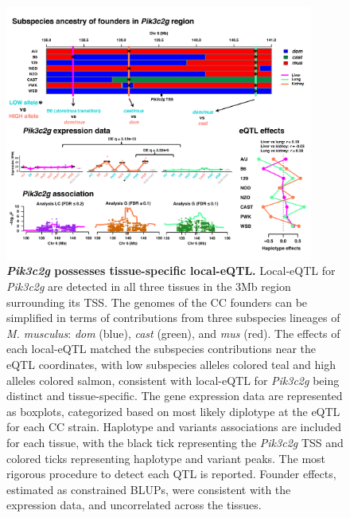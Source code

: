\documentclass[9pt,twocolumn,twoside]{gsajnl}
\begin{document}
\begin{figure}[h]
\renewcommand{\familydefault}{\sfdefault}\normalfont
\centering
\includegraphics[width=0.9\textwidth, trim={0in 0.5in 0in 0in}, clip]{figs/pik3c2g_example.pdf}
\caption{\textbf{\textit{Pik3c2g} possesses tissue-specific local-eQTL.} Local-eQTL for \textit{Pik3c2g} are detected in all three tissues in the 3Mb region surrounding its TSS. The genomes of the CC founders can be simplified in terms of contributions from three subspecies lineages of \textit{M. musculus}: \textit{dom} (blue), \textit{cast} (green), and \textit{mus} (red). The effects of each local-eQTL matched the subspecies contributions near the eQTL coordinates, with low subspecies alleles colored teal and high alleles colored salmon, consistent with local-eQTL for \textit{Pik3c2g} being distinct and tissue-specific. The gene expression data are represented as boxplots, categorized based on most likely diplotype at the eQTL for each CC strain. Haplotype and variants associations are included for each tissue, with the black tick representing the \textit{Pik3c2g} TSS and colored ticks representing haplotype and variant peaks. The most rigorous procedure to detect each QTL is reported. Founder effects, estimated as constrained BLUPs, were consistent with the expression data, and uncorrelated across the tissues.\label{fig:pik3c2g}}
\end{figure}
\end{document}
